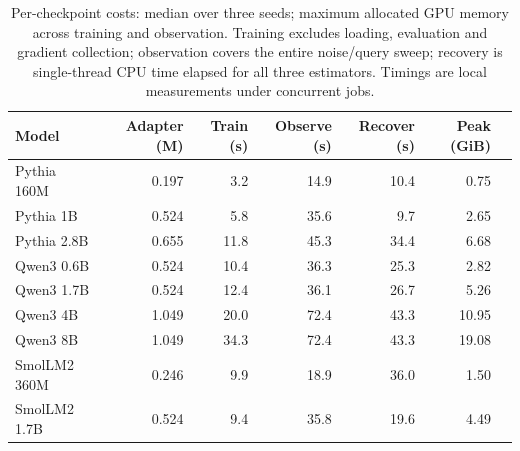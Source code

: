 \begin{table}[t]
\centering\small
\caption{Per-checkpoint costs: median over three seeds; maximum allocated GPU memory across training and observation. Training excludes loading, evaluation and gradient collection; observation covers the entire noise/query sweep; recovery is single-thread CPU time elapsed for all three estimators. Timings are local measurements under concurrent jobs.}
\label{tab:llm-cost}
\begin{tabular}{lrrrrrr}
\toprule
Model & Adapter (M) & Train (s) & Observe (s) & Recover (s) & Peak (GiB)\\
\midrule
Pythia 160M & 0.197 & 3.2 & 14.9 & 10.4 & 0.75\\
Pythia 1B & 0.524 & 5.8 & 35.6 & 9.7 & 2.65\\
Pythia 2.8B & 0.655 & 11.8 & 45.3 & 34.4 & 6.68\\
Qwen3 0.6B & 0.524 & 10.4 & 36.3 & 25.3 & 2.82\\
Qwen3 1.7B & 0.524 & 12.4 & 36.1 & 26.7 & 5.26\\
Qwen3 4B & 1.049 & 20.0 & 72.4 & 43.3 & 10.95\\
Qwen3 8B & 1.049 & 34.3 & 72.4 & 43.3 & 19.08\\
SmolLM2 360M & 0.246 & 9.9 & 18.9 & 36.0 & 1.50\\
SmolLM2 1.7B & 0.524 & 9.4 & 35.8 & 19.6 & 4.49\\
\bottomrule
\end{tabular}
\end{table}
